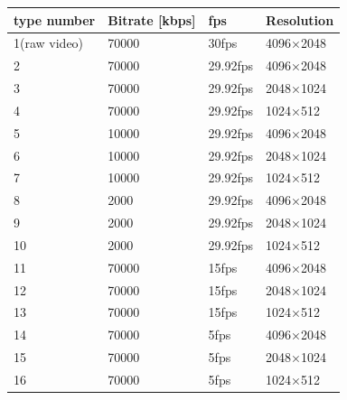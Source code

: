 \begin{tabular}{llll}
\toprule
type number & Bitrate [kbps] & fps & Resolution \\
\midrule
1(raw video) & 70000 & 30fps & 4096×2048 \\
2 & 70000 & 29.92fps & 4096×2048 \\
3 & 70000 & 29.92fps & 2048×1024 \\
4 & 70000 & 29.92fps & 1024×512 \\
5 & 10000 & 29.92fps & 4096×2048 \\
6 & 10000 & 29.92fps & 2048×1024 \\
7 & 10000 & 29.92fps & 1024×512 \\
8 & 2000 & 29.92fps & 4096×2048 \\
9 & 2000 & 29.92fps & 2048×1024 \\
10 & 2000 & 29.92fps & 1024×512 \\
11 & 70000 & 15fps & 4096×2048 \\
12 & 70000 & 15fps & 2048×1024 \\
13 & 70000 & 15fps & 1024×512 \\
14 & 70000 & 5fps & 4096×2048 \\
15 & 70000 & 5fps & 2048×1024 \\
16 & 70000 & 5fps & 1024×512 \\
\bottomrule
\end{tabular}
